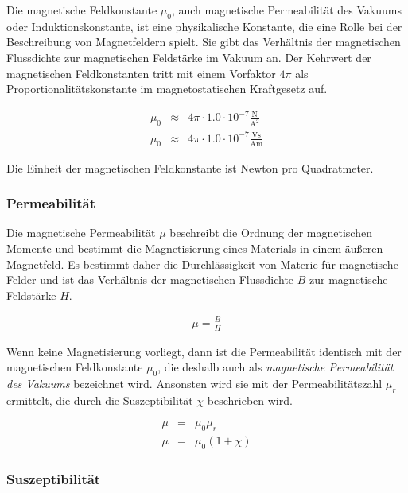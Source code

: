 \documentclass[12pt,a4paper]{scrartcl}
\numberwithin{equation}{section} %
\begin{document}
Die magnetische Feldkonstante $\mu_0$, auch magnetische Permeabilität
des Vakuums oder Induktionskonstante, ist eine physikalische Konstante,
die eine Rolle bei der Beschreibung von Magnetfeldern spielt. Sie gibt
das Verhältnis der magnetischen Flussdichte zur magnetischen Feldstärke
im Vakuum an. Der Kehrwert der magnetischen Feldkonstanten tritt mit
einem Vorfaktor $4\pi$ als Proportionalitätskonstante im
magnetostatischen Kraftgesetz auf.

\begin{eqnarray}
    \mu_0 &\approx& 4\pi \cdot \mathrm{1.0 \cdot 10^{-7} \frac{N}{A^2}} \\
    \mu_0 &\approx& 4\pi \cdot \mathrm{1.0 \cdot 10^{-7} \frac{Vs}{Am}}
\end{eqnarray}

Die Einheit der magnetischen Feldkonstante ist Newton pro Quadratmeter.

\hypertarget{permeabilituxe4t}{%
\subsubsection{Permeabilität}\label{permeabilituxe4t}}

Die magnetische Permeabilität $\mu$ beschreibt die Ordnung der
magnetischen Momente und bestimmt die Magnetisierung eines Materials in
einem äußeren Magnetfeld. Es bestimmt daher die Durchlässigkeit von
Materie für magnetische Felder und ist das Verhältnis der magnetischen
Flussdichte $B$ zur magnetische Feldstärke $H$.

\begin{eqnarray}
    \mu = \frac{B}{H}
\end{eqnarray}

Wenn keine Magnetisierung vorliegt, dann ist die Permeabilität identisch
mit der magnetischen Feldkonstante $\mu_0$, die deshalb auch als
\emph{magnetische Permeabilität des Vakuums} bezeichnet wird. Ansonsten
wird sie mit der Permeabilitätszahl $\mu_r$ ermittelt, die durch die
Suszeptibilität $\chi$ beschrieben wird.

\begin{eqnarray}
    \mu &=& \mu_0\mu_r \\
    \mu &=& \mu_0(1+\chi)
\end{eqnarray}

\hypertarget{suszeptibilituxe4t}{%
\subsubsection{Suszeptibilität}\label{suszeptibilituxe4t}}
\end{document}
